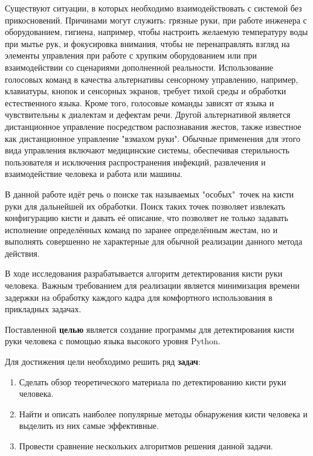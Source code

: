 
Существуют ситуации, в которых необходимо взаимодействовать с системой без прикосновений.
Причинами могут служить: грязные руки, при работе инженера с оборудованием, гигиена, 
например, чтобы настроить желаемую температуру воды при мытье рук, и фокусировка внимания,
чтобы не перенаправлять взгляд на элементы управления при работе с хрупким оборудованием
или при взаимодействии со сценариями дополненной реальности. Использование голосовых команд
в качества альтернативы сенсорному управлению, например, клавиатуры, кнопок и сенсорных экранов,
требует тихой среды и обработки естественного языка. Кроме того, голосовые команды
зависят от языка и чувствительны к диалектам и дефектам речи. Другой альтернативой является
дистанционное управление посредством распознавания жестов, также известное как
дистанционное управление "взмахом руки". Обычные применения для этого вида управления 
включают медицинские системы, обеспечивая стерильность пользователя и исключения 
распространения инфекций, развлечения и взаимодействие человека и работа или машины.

В данной работе идёт речь о поиске так называемых "особых"\ точек на кисти руки 
для дальнейшей их обработки. Поиск таких точек позволяет извлекать конфигурацию кисти
и давать её описание, что позволяет не только задавать исполнение определённых 
команд по заранее определённым жестам, но и выполнять совершенно не характерные для обычной
реализации данного метода действия.

В ходе исследования разрабатывается алгоритм детектирования кисти руки человека.
Важным требованием для реализации является минимизация времени
задержки на обработку каждого кадра для комфортного использования в прикладных задачах.

Поставленной {\bf целью} является создание программы для детектирования кисти руки человека с помощью 
языка высокого уровня Python.

Для достижения цели необходимо решить ряд {\bf задач}:
\begin{enumerate}
	\item Сделать обзор теоретического материала по детектированию кисти руки человека.
	\item Найти и описать наиболее популярные методы обнаружения кисти человека и выделить из них самые эффективные.
	\item Провести сравнение нескольких алгоритмов решения данной задачи.
\end{enumerate}